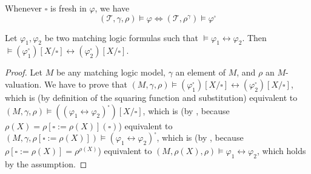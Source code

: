 \begin{lemma}\label{lem:patternToFOLSemantics}
    Whenever $\square$ is fresh in $\varphi$, we have
    \begin{equation*}
        (\mathcal{T}, \gamma, \rho) \vDash \varphi \iff (\mathcal{T}, \rho^\gamma) \vDash \varphi^\square
    \end{equation*}    
\end{lemma}

\begin{lemma}\label{lem:equivFOLtransl}
    Let $\varphi_1, \varphi_2$ be two matching logic formulas such that $\vDash \varphi_1 \leftrightarrow \varphi_2$.
    Then $\vDash (\varphi_1^\square)[X/\square] \leftrightarrow (\varphi_2^\square)[X/\square]$.
\end{lemma}
\begin{proof}
    Let $M$ be any matching logic model, $\gamma$ an element of $M$, and $\rho$ an $M$-valuation.
    We have to prove that $(M, \gamma, \rho) \vDash (\varphi_1^\square)[X/\square] \leftrightarrow (\varphi_2^\square)[X/\square]$,
    which is (by definition of the squaring function and substitution) equivalent to
    $(M, \gamma, \rho) \vDash ((\varphi_1 \leftrightarrow \varphi_2)^\square)[X/\square]$,
    which is
    (by , because $\rho(X) = \rho[\square := \rho(X)](\square)$)
    equivalent to
    $(M, \gamma, \rho[\square := \rho(X)]) \vDash (\varphi_1 \leftrightarrow \varphi_2)^\square$,
    which is  (by , because $\rho[\square := \rho(X)] = \rho^{\rho(X)}$) equivalent to
    $(M, \rho(X), \rho) \vDash \varphi_1 \leftrightarrow \varphi_2$,
    which holds by the assumption.
\end{proof}

